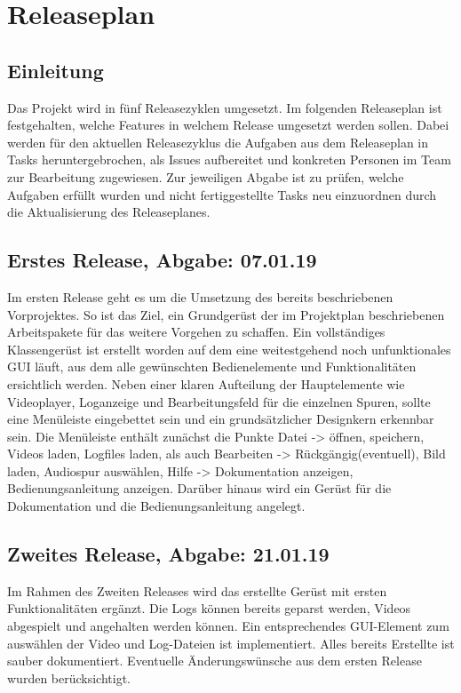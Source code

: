 \chapter{Releaseplan}

\section{Einleitung}

Das Projekt wird in fünf Releasezyklen umgesetzt. Im folgenden Releaseplan ist festgehalten, welche Features in welchem Release umgesetzt werden sollen. 
Dabei werden für den aktuellen Releasezyklus die Aufgaben aus dem Releaseplan in Tasks heruntergebrochen, als Issues aufbereitet und konkreten Personen im Team zur Bearbeitung zugewiesen. 
Zur jeweiligen Abgabe ist zu prüfen, welche Aufgaben erfüllt wurden und nicht fertiggestellte Tasks neu einzuordnen durch die Aktualisierung des Releaseplanes.

\section{Erstes Release, Abgabe: 07.01.19}

Im ersten Release geht es um die Umsetzung des bereits beschriebenen Vorprojektes. 
So ist das Ziel, ein Grundgerüst der im Projektplan beschriebenen Arbeitspakete für das weitere Vorgehen zu schaffen. 
Ein vollständiges Klassengerüst ist erstellt worden auf dem eine weitestgehend noch unfunktionales GUI läuft, aus dem alle gewünschten Bedienelemente und Funktionalitäten ersichtlich werden. 
Neben einer klaren Aufteilung der Hauptelemente wie Videoplayer, Loganzeige und Bearbeitungsfeld für die einzelnen Spuren, sollte eine Menüleiste eingebettet sein und ein grundsätzlicher Designkern erkennbar sein. 
Die Menüleiste enthält zunächst die Punkte Datei -> öffnen, speichern, Videos laden, Logfiles laden, als auch
Bearbeiten -> Rückgängig(eventuell), Bild laden, Audiospur auswählen, Hilfe -> Dokumentation anzeigen, Bedienungsanleitung anzeigen.
Darüber hinaus wird ein Gerüst für die Dokumentation und die Bedienungsanleitung angelegt.

\section{Zweites Release, Abgabe: 21.01.19}

Im Rahmen des Zweiten Releases wird das erstellte Gerüst mit ersten Funktionalitäten ergänzt. 
Die Logs können bereits geparst werden, Videos abgespielt und angehalten werden können. 
Ein entsprechendes GUI-Element zum auswählen der Video und Log-Dateien ist implementiert. 
Alles bereits Erstellte ist sauber dokumentiert. 
Eventuelle Änderungswünsche aus dem ersten Release wurden berücksichtigt. 

